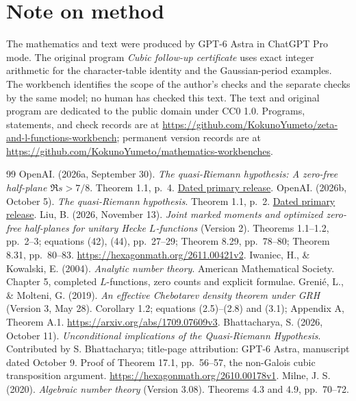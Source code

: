 \documentclass[11pt]{article}
\newcommand{\workbenchurl}{https://github.com/KokunoYumeto/zeta-and-l-functions-workbench}
\newcommand{\recordurl}{https://github.com/KokunoYumeto/mathematics-workbenches}
\begin{document}
\section*{Note on method}
The mathematics and text were produced by GPT-6 Astra in ChatGPT
Pro mode. The original program \emph{Cubic follow-up certificate}
uses exact integer arithmetic for the character-table identity and
the Gaussian-period examples. The workbench identifies the scope
of the author's checks and the separate checks by the same model;
no human has checked this text. The text and original program are
dedicated to the public domain under CC0 1.0. Programs, statements,
and check records are at \url{\workbenchurl}; permanent version
records are at \url{\recordurl}.

\begin{thebibliography}{99}
\small
\setlength{\itemsep}{3pt}
 OpenAI. (2026a, September 30).
\emph{The quasi-Riemann hypothesis: A zero-free half-plane
$\Re s>7/8$}. Theorem 1.1, p.~4.
\href{https://github.com/openai/math/blob/main/preprints/The-Quasi-Riemann-Hypothesis-September-30-2026/paper.pdf}{Dated primary release}.
 OpenAI. (2026b, October 5).
\emph{The quasi-Riemann hypothesis}. Theorem 1.1, p.~2.
\href{https://github.com/openai/math/blob/main/preprints/The-Quasi-Riemann-Hypothesis-October-5-2026/paper2.pdf}{Dated primary release}.
 Liu, B. (2026, November 13).
\emph{Joint marked moments and optimized zero-free half-planes
for unitary Hecke $L$-functions} (Version 2).
Theorems 1.1--1.2, pp.~2--3; equations (42), (44), pp.~27--29;
Theorem 8.29, pp.~78--80; Theorem 8.31, pp.~80--83.
\url{https://hexagonmath.org/2611.00421v2}.
 Iwaniec, H., \& Kowalski, E. (2004).
\emph{Analytic number theory}. American Mathematical Society.
Chapter 5, completed $L$-functions, zero counts and explicit formulae.
 Greni\'e, L., \& Molteni, G. (2019).
\emph{An effective Chebotarev density theorem under GRH}
(Version 3, May 28). Corollary 1.2; equations (2.5)--(2.8) and
(3.1); Appendix A, Theorem A.1.
\url{https://arxiv.org/abs/1709.07609v3}.
 Bhattacharya, S. (2026, October 11).
\emph{Unconditional implications of the Quasi-Riemann Hypothesis}.
Contributed by S. Bhattacharya; title-page attribution: GPT-6 Astra,
manuscript dated October 9. Proof of Theorem 17.1, pp.~56--57,
the non-Galois cubic transposition argument.
\url{https://hexagonmath.org/2610.00178v1}.
 Milne, J. S. (2020).
\emph{Algebraic number theory} (Version 3.08).
Theorems 4.3 and 4.9, pp.~70--72.

\end{thebibliography}
\end{document}
